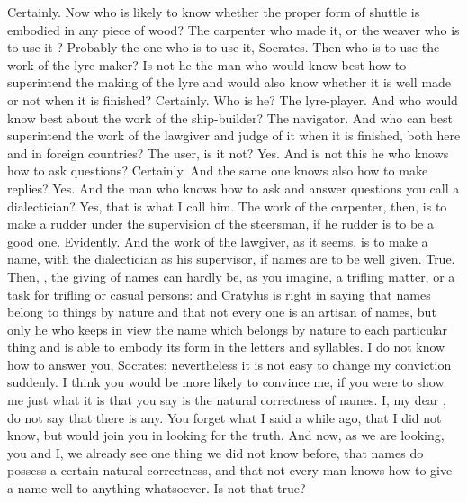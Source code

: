 \hermogenesspeaks
Certainly. 
\socratesspeaks
Now who is likely to know whether the proper form of shuttle is embodied in any piece of wood? The carpenter who made it, or the weaver who is to use it ?
\hermogenesspeaks
Probably the one who is to use it, Socrates.
\socratesspeaks
Then who is to use the work of the lyre-maker? Is not he the man who would know best how to superintend the making of the lyre and would also know whether it is well made or not when it is finished?
\hermogenesspeaks
Certainly.
\socratesspeaks
Who is he?
\hermogenesspeaks
The lyre-player.
\socratesspeaks
And who would know best about the work of the ship-builder? 
\hermogenesspeaks
The navigator.
\socratesspeaks
And who can best superintend the work of the lawgiver and judge of it when it is finished, both here and in foreign countries? The user, is it not?
\hermogenesspeaks
Yes.
\socratesspeaks
And is not this he who knows how to ask questions?
\hermogenesspeaks
Certainly.
\socratesspeaks
And the same one knows also how to make replies?
\hermogenesspeaks
Yes.
\socratesspeaks
And the man who knows how to ask and answer questions you call a dialectician?
\hermogenesspeaks
Yes, that is what I call him. 
\socratesspeaks
The work of the carpenter, then, is to make a rudder under the supervision of the steersman, if he rudder is to be a good one.
\hermogenesspeaks
Evidently.
\socratesspeaks
And the work of the lawgiver, as it seems, is to make a name, with the dialectician as his supervisor, if names are to be well given.
\hermogenesspeaks
True.
\socratesspeaks
Then, \hermogenesspeaks, the giving of names can hardly be, as you imagine, a trifling matter, or a task for trifling or casual persons: and Cratylus is right in saying that names belong to things by nature  and that not every one is an artisan of names, but only he who keeps in view the name which belongs by nature to each particular thing and is able to embody its form in the letters and syllables.
\hermogenesspeaks
I do not know how to answer you, Socrates; nevertheless it is not easy to change my conviction suddenly.  I think you would be more likely to convince me, if you were to show me just what it is that you say is the natural correctness of names.
\socratesspeaks
I, my dear \hermogenesspeaks, do not say that there is any. You forget what I said a while ago, that I did not know, but would join you in looking for the truth. And now, as we are looking, you and I, we already see one thing we did not know before, that names do possess a certain natural correctness, and that not every man knows  how to give a name well to anything whatsoever. Is not that true?
